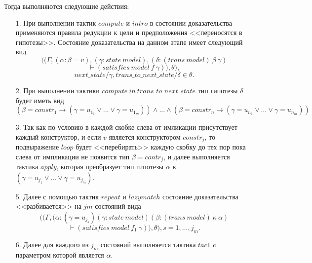 \documentclass[12pt]{article}
\begin{document}
Тогда выполняются следующие действия:
\begin{enumerate}
    \item[1.] При выполнении тактик $compute$ и $intro$ в состоянии доказательства применяются правила редукции к цели и предположения <<переносятся в гипотезы>>. Состояние доказательства на данном этапе имеет следующий вид
    $$((\Gamma, (\alpha: \beta = v), (\gamma: state\ model), (\delta: (trans\  model)\ \beta\ \gamma) $$
    $$\vdash (satisfies\ model\ f\ \gamma)), \theta),$$
    $$next\_state/\gamma, trans\_to\_next\_state/\delta \in \theta.$$
    \item[2.] При выполнении тактики $compute\ in\ trans\_to\_next\_state$ тип гипотезы $\delta$ будет иметь вид
    $$(\beta = constr_1 \xrightarrow{} (\gamma=u_{1_1} \vee ... \vee \gamma=u_{1_m})) \wedge ... \wedge (\beta = constr_n \xrightarrow{} (\gamma=u_{n_1} \vee ... \vee \gamma=u_{n_m}))$$
    \item[3.] Так как по условию в каждой скобке слева от имликации присутствует каждый конструктор, и если $v$ является конструктором $constr_j$, то подвыражение $loop$ будет <<перебирать>> каждую скобку до тех пор пока слева от импликации не появится тип $\beta=contr_j$, и далее выполняется тактика $apply$, которая преобразует тип гипотезы $\alpha$ в $(\gamma=u_{j_1} \vee ... \vee \gamma=u_{j_m}).$
    \item[5.] Далее с помощью тактик $repeat$ и $lazymatch$ состояние доказательства <<разбивается>> на $jm$ состояний вида
    $$((\Gamma, (\alpha: (\gamma=u_{j_s}) (\gamma: state\ model) (\beta: (trans\  model)\ \kappa\ \alpha ) $$
    $$\vdash (satisfies\ model\ f_1\ \gamma)), \theta), s=1,...,j_m.$$
    
    
    \item[6.] Далее для каждого из $j_m$ состояний выполняется тактика $tac1$ c параметром которой является $\alpha$.
\end{enumerate}
\end{document}

